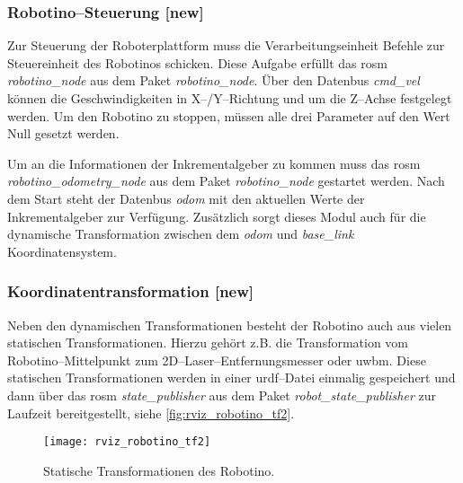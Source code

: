 \subsubsection{Robotino--Steuerung [new]}

Zur Steuerung der Roboterplattform muss die Verarbeitungseinheit Befehle zur Steuereinheit des Robotinos schicken. Diese Aufgabe erfüllt das \Gls{rosm} \textit{robotino\_node} aus dem Paket \textit{robotino\_node}. Über den Datenbus \textit{cmd\_vel} können die Geschwindigkeiten in X--/Y--Richtung und um die Z--Achse festgelegt werden. Um den Robotino zu stoppen, müssen alle drei Parameter auf den Wert Null gesetzt werden.

Um an die Informationen der Inkrementalgeber zu kommen muss das \Gls{rosm} \textit{robotino\_odometry\_node} aus dem Paket \textit{robotino\_node} gestartet werden. Nach dem Start steht der Datenbus \textit{odom} mit den aktuellen Werte der Inkrementalgeber zur Verfügung. Zusätzlich sorgt dieses Modul auch für die dynamische Transformation zwischen dem \textit{odom} und \textit{base\_link} Koordinatensystem.


\begin{comment}
--------------------------------------------------------------------------------
- \url{http://wiki.ros.org/robot_state_publisher}
- \url{http://wiki.ros.org/urdf}
\end{comment}
\subsubsection{Koordinatentransformation [new]}

Neben den dynamischen Transformationen besteht der Robotino auch aus vielen statischen Transformationen. Hierzu gehört z.B. die Transformation vom Robotino--Mittelpunkt zum 2D--Laser--Entfernungsmesser oder \Gls{uwbm}. Diese statischen Transformationen werden in einer \Gls{urdf}--Datei einmalig gespeichert und dann über das \Gls{rosm} \textit{state\_publisher} aus dem Paket \textit{robot\_state\_publisher} zur Laufzeit bereitgestellt, siehe \autoref{fig:rviz_robotino_tf2}.

\begin{figure}[h]
	\centering
	\texttt{[image: rviz\_robotino\_tf2]}
	\caption{Statische Transformationen des Robotino.}
	\label{fig:rviz_robotino_tf2}
\end{figure}


\begin{comment}
--------------------------------------------------------------------------------
- \url{http://wiki.ros.org/joy}
- todo: Referenz auf das lst:joy_node stehen lassen?
\end{comment}
